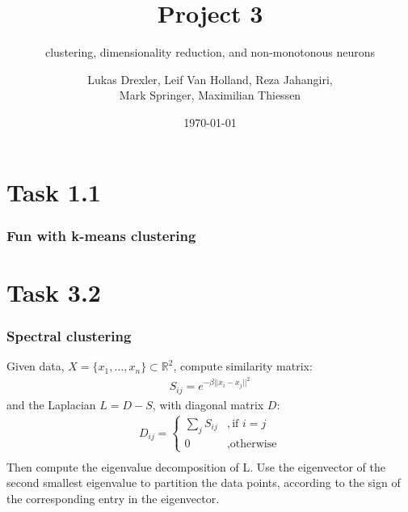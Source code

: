\documentclass{beamer}
\title[Project 3]{Project 3}
\subtitle{clustering, dimensionality reduction, and non-monotonous neurons}
\author{Lukas Drexler, Leif Van Holland, Reza Jahangiri,\\Mark Springer, Maximilian Thiessen}
\institute[Universität Bonn]{Rheinische Friedrich-Wilhelms-Universität}
\date{\today}
\begin{document}
	
\begin{frame}%
	\titlepage
\end{frame}



\section{Task 1.1}

\begin{frame}
\frametitle{Fun with k-means clustering}

\end{frame}


\section{Task 3.2}
\begin{frame}
	\frametitle{Spectral clustering}
	Given data, $X = \{x_1,\ldots,x_n\} \subset \mathbb{R}^2$, compute similarity matrix:
	\begin{align*}
		S_{ij} = e^{-\beta ||x_i-x_j||^2}
	\end{align*}
	and the Laplacian $L = D-S$, with diagonal matrix $D$:
	\begin{align*}
	D_{ij} = \begin{cases}
	\sum_j S_{ij} & ,\text{if } i=j\\
	0 &, \text{otherwise}
	\end{cases}\\
	\end{align*}
	Then compute the eigenvalue decomposition of L. Use the eigenvector of the second smallest eigenvalue to partition the data points, according to the sign of the corresponding entry in the eigenvector.
\end{frame}
\end{document}
